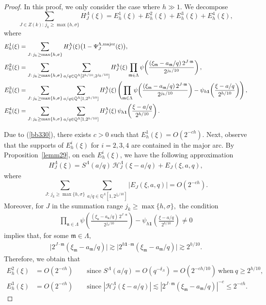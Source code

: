 \documentclass[10pt,a4paper]{amsart}
\numberwithin{equation}{section}
\begin{document}
\begin{proof}
 In this proof, we only consider the case where $h\gg 1$. We decompose
\[
\sum_{J\in Z(k):\, j_k\ge \max\{h,\sigma\}}  H^{\Lambda}_{J}(\xi)
=E^1_h(\xi)+E^2_h(\xi)+E^3_h(\xi)+E^4_h(\xi),
\]
where
\begin{align*}
E^1_h(\xi)& = \sum_{J:\, j_k\ge \max\{h,\sigma\}} 
H^{\Lambda}_J(\xi)\bigl(1- \Psi^{\Lambda,\mathrm{major}}_{J}(\xi)\bigr),\\
E^2_h(\xi)&=\sum_{J:\, j_k\ge \max\{h,\sigma\}} 
\sum_{a/q\in \mathbb{Q}^{\Lambda}[2^{h/10}, 2^{j_k/10} ] }  
H^{\Lambda}_J(\xi)\prod_{\mathfrak{m}\in \Lambda}
\psi\!\left(\frac{(\xi_{\mathfrak{m}}-a_{\mathfrak{m}}/q)\, 2^{J\cdot \mathfrak{m}}}{2^{j_k/10}}\right),\\
E^3_h(\xi)&=\sum_{J:\, j_k\ge \max\{h,\sigma\}}  
\sum_{a/q\in \mathbb{Q}^{\Lambda}[1,2^{h/10}]}  
H^{\Lambda}_J(\xi) 
\left(\prod_{\mathfrak{m}\in \Lambda}
\psi\!\left(\frac{(\xi_{\mathfrak{m}}-a_{\mathfrak{m}}/q)\, 2^{J\cdot \mathfrak{m}}}{2^{j_k/10}}\right)
-\psi_{h{\bf 1}}\!\left(\frac{\xi-a/q}{2^{h/10}}\right)\right),\\
E^4_h(\xi)&=\sum_{J:\, j_k\ge \max\{h,\sigma\}}    
\sum_{a/q\in \mathbb{Q}^{\Lambda}[1,2^{h/10}]}  
H^{\Lambda}_J(\xi)\,
\psi_{h{\bf 1}}\!\left(\frac{\xi-a/q}{2^{h/10}}\right).
\end{align*}

 
Due to (\ref{bb330}), there exists $c>0$ such that $E^1_h(\xi)=O(2^{-ch})$. Next, observe that the supports of $E^i_h(\xi)$ for $i=2,3,4$ are contained in the major arc. 
By Proposition~\ref{lemm29}, on each $E^i_h(\xi)$, we have the following approximation
\begin{align*}
H_J^{\Lambda}(\xi)
= S^{\Lambda}(a/q)\, \mathcal{H}^{\Lambda}_J(\xi-a/q)
+ E_J(\xi,a,q),
\end{align*}
where
\[
\sum_{J:\, j_k\ge \max\{h,\sigma\}} 
\sum_{a/q\in \mathbb{Q}^{\Lambda}[1,2^{j_k/10}]}
|E_J(\xi,a,q)|
=O(2^{-ch}).
\] Moreover, for
\(
J
\)
in the summation range
\(
j_k\ge \max\{h,\sigma\},
\)
the condition
\begin{align*}
	\prod_{\mathfrak{n}\in\Lambda}
	\psi\!\left(
	\frac{(\xi_{\mathfrak{n}}-a_{\mathfrak{n}}/q)\,
		2^{J\cdot\mathfrak{n}}}
	{2^{j_k/10}}
	\right)
	-
	\psi_{h\mathbf{1}}\!\left(
	\frac{\xi-a/q}{2^{h/10}}
	\right)
	\neq 0
\end{align*}
implies that, for some
\(
\mathfrak{m}\in\Lambda,
\)
\begin{align*}
	\bigl|2^{J\cdot\mathfrak{m}}
	(\xi_{\mathfrak{m}}-a_{\mathfrak{m}}/q)\bigr|\gtrsim \bigl|2^{h\mathbf{1}\cdot\mathfrak{m}}
	(\xi_{\mathfrak{m}}-a_{\mathfrak{m}}/q)\bigr|
	\gtrsim 2^{h/10}.
\end{align*}
Therefore, we obtain that
\begin{align*}
E^2_h(\xi)&=O(2^{-ch}) 
\qquad \text{since } S^{\Lambda}(a/q)=O(q^{-\delta_{\Lambda}})=O(2^{-ch/10}) \ \text{when} \  q\ge 2^{h/10},\\
E^3_h(\xi)&=O(2^{-ch})
\qquad \text{since } 
|\mathcal{H}_{J}^{\Lambda}(\xi-a/q)|
\lesssim |2^{J\cdot \mathfrak{m}} (\xi_{\mathfrak{m}}-a_{\mathfrak{m}}/q)|^{-c}
\le 2^{-ch}.
\end{align*}





\end{proof}
\end{document}

